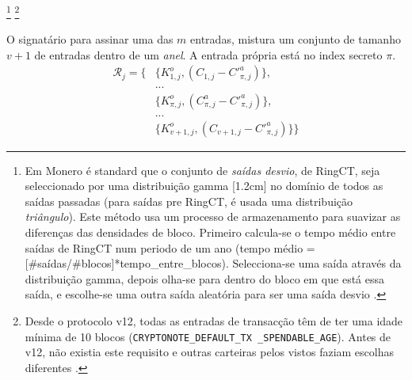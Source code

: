
\footnote{\label{input-selection}Em Monero é standard que o conjunto  de {\em saídas desvio}, de RingCT, seja seleccionado por uma distribuição gamma [1.2cm] no domínio de todos as saídas passadas (para saídas pre RingCT, é usada uma distribuição {\em triângulo}). Este método usa um processo de armazenamento para suavizar as diferenças das densidades de bloco. Primeiro calcula-se o tempo médio entre saídas de RingCT num periodo de um ano (tempo médio = [\#saídas/\#blocos]*tempo\_entre\_blocos). Selecciona-se uma saída através da distribuição gamma, depois olha-se para dentro do bloco em que está essa saída, e escolhe-se uma outra saída aleatória para ser uma saída desvio \cite{AnalysisOfLinkability}.}%
\footnote{Desde o protocolo v12, todas as entradas de transacção têm de ter uma idade mínima de 10 blocos ({\tt CRYPTONOTE\_DEFAULT\_TX \_SPENDABLE\_AGE}). Antes de v12, não existia este requisito e outras carteiras pelos vistos faziam escolhas diferentes \cite{visualizing-monero-vid}.}

O signatário para assinar uma das $m$ entradas, mistura um conjunto de tamanho $v+1$ de entradas dentro de um {\em anel}. A entrada própria está no index secreto $\pi$.  
\vspace{.175cm}
\begin{align*}
    \mathcal{R}_j = \{&\{K^o_{1, j}, (C_{1, j} - C'^a_{\pi, j})\}, \\
    &... \\
    &\{ K^o_{\pi, j}, (C^a_{\pi, j} - C'^a_{\pi, j})\}, \\
    &... \\
    &\{ K^o_{v+1, j}, (C_{v+1, j} - C'^a_{\pi, j})\}\}
\end{align*}
\vspace{.175cm}

